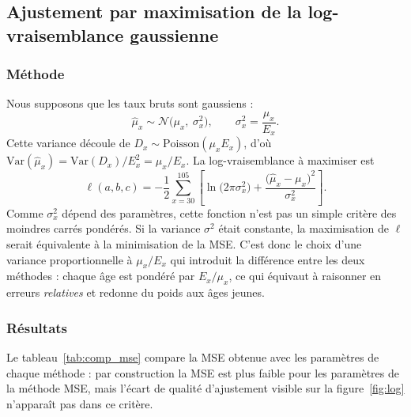 \documentclass[11pt,a4paper]{article}
\newcommand{\mux}{\mu_x}
\newcommand{\muhat}{\hat{\mu}_x}
\begin{document}
\subsection{Ajustement par maximisation de la log-vraisemblance gaussienne}

\subsubsection{Méthode}

Nous supposons que les taux bruts sont gaussiens :
\[
\muhat \sim \mathcal N\big(\mux,\ \sigma_x^2\big), \qquad \sigma_x^2=\frac{\mux}{E_x}.
\]
Cette variance découle de $D_x\sim\mathrm{Poisson}(\mux E_x)$, d'où $\mathrm{Var}(\muhat)=\mathrm{Var}(D_x)/E_x^2=\mux/E_x$. La log-vraisemblance à maximiser est
\[
\ell(a,b,c)=-\frac12\sum_{x=30}^{105}\left[\ln\!\big(2\pi\sigma_x^2\big)+\frac{\big(\muhat-\mux\big)^2}{\sigma_x^2}\right].
\]
Comme $\sigma_x^2$ dépend des paramètres, cette fonction n'est pas un simple critère des moindres carrés pondérés. Si la variance $\sigma^2$ était constante, la maximisation de $\ell$ serait équivalente à la minimisation de la MSE. C'est donc le choix d'une variance proportionnelle à $\mux/E_x$ qui introduit la différence entre les deux méthodes : chaque âge est pondéré par $E_x/\mux$, ce qui équivaut à raisonner en erreurs \emph{relatives} et redonne du poids aux âges jeunes.

\subsubsection{Résultats}



Le tableau~\ref{tab:comp_mse} compare la MSE obtenue avec les paramètres de chaque méthode : par construction la MSE est plus faible pour les paramètres de la méthode MSE, mais l'écart de qualité d'ajustement visible sur la figure~\ref{fig:log} n'apparaît pas dans ce critère.



\end{document}

